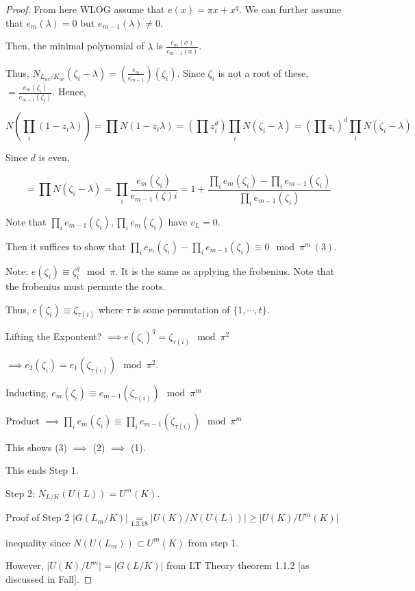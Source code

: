 \documentclass{article}
\theoremstyle{definition}
\numberwithin{theorem}{subsection}
\begin{document}
\begin{proof}
        From here WLOG assume that \(e(x) = \pi x + x^q\). We can further assume that \(e_m(\lambda) = 0\) but \(e_{m-1}(\lambda)\neq 0\).

        Then, the minimal polynomial of \(\lambda\) is \(\frac{e_m(x)}{e_{m-1}(x)}\).

        Thus, \(N_{L_{nr} / K_{nr}}(\zeta_i - \lambda) = \left( \frac{e_m}{e_{m-1}} \right)(\zeta_i)\). Since \(\zeta_i\) is not a root of these, \(= \frac{e_m(\zeta_i)}{e_{m-1}(\zeta_i)}\). Hence,

        \[
            N \left( \prod_i (1 - z_i \lambda) \right) = \prod N(1 - z_i \lambda) = \left( \prod z_i ^d \right) \prod_i N(\zeta_i - \lambda) = \left( \prod z_i \right)^d \prod_i N(\zeta_i - \lambda)
        \]

        Since \(d\) is even,

        \[
            = \prod N(\zeta_i - \lambda) = \prod_i \frac{e_m(\zeta_i)}{e_{m-1}(\zeta)i} = 1 + \frac{\prod_i e_m(\zeta_i) - \prod_i e_{m-1}(\zeta_i)}{\prod_i e_{m-1}(\zeta_i)}
        \]

        Note that \(\prod_i e_{m-1}(\zeta_i), \prod_i e_m(\zeta_i)\) have \(v_L = 0\).

        Then it suffices to show that \(\prod_i e_m (\zeta_i) - \prod_i e_{m-1} (\zeta_i) \equiv 0\mod \pi^m \, (3)\).

        Note: \(e(\zeta_i) \equiv \zeta_i^q \mod \pi\). It is the same as applying the frobenius. Note that the frobenius must permute the roots.

        Thus, \(e(\zeta_i) \equiv \zeta_{\tau(i)}\) where \(\tau\) is some permutation of \(\{ 1, \cdots , t \}\).

        Lifting the Expontent? \(\implies e(\zeta_i)^q = \zeta_{\tau(i)}\mod \pi^2\)

        \(\implies e_2(\zeta_i) = e_1(\zeta_{\tau(i)})\mod \pi^2\).
        
        Inducting, \(e_m(\zeta_i) \equiv e_{m-1} (\zeta_{\tau(i)})\mod \pi^m\)
        
        Product \(\implies \prod_i e_m(\zeta_i) \equiv \prod_i e_{m-1} (\zeta_{\tau(i)}) \mod \pi^m\)
        
        This shows (3) \(\implies\) (2) \(\implies\) (1).

        This ends Step 1.

        Step 2: \(N_{L / K}(U(L)) = U^m(K)\).

        Proof of Step 2 \(\vert G(L_m / K) \vert \underset{1.3.18}{=} \vert U(K) / N(U(L)) \vert \geq \vert U(K) / U^m(K) \vert\)
        
        inequality since \(N(U(L_m)) \subset U^m(K)\) from step 1.

        However, \(\vert U(K) / U^m \vert = \vert G(L / K) \vert\) from LT Theory theorem 1.1.2 [as discussed in Fall].
        
    \end{proof}
\end{document}
